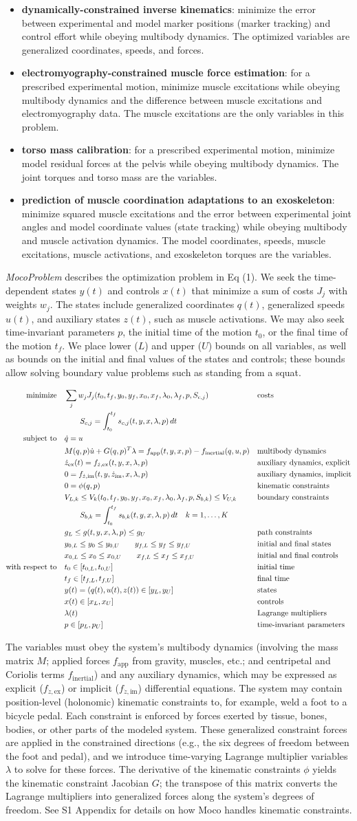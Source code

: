 \documentclass[10pt,letterpaper]{article}
\newcommand{\ocp}{
\begin{adjustwidth}{-1.125in}{-1.125in} %
\begin{align}
    \begin{aligned}
        \mbox{minimize}
         \quad & \sum_j w_{j} J_{j}(t_0, t_f, y_0, y_f, x_{0}, \mathrlap{x_{f}, \lambda_0, \lambda_f, p, S_{c,j})} && \textrm{costs} \\
        & \quad\quad S_{c,j} = \int_{t_0}^{t_f} s_{c,j}(t, y, x, \lambda, p)\,dt  \\
        \mbox{subject to}
         \quad & \dot{q} = u \\
         & M(q, p)\dot{u} + G(q, p)^T \lambda = f_{\mathrm{app}}(t, y, x, p) - f_{\mathrm{inertial}}(q, u, p)  && \textrm{multibody dynamics} \\
         & \dot{z}_\textrm{ex}(t) = f_{\dot{z},\textrm{ex}}(t, y, x, \lambda, p) && \textrm{auxiliary dynamics, explicit} \\
         & 0 = f_{\dot{z},\textrm{im}}(t, y, \dot{z}_{\textrm{im}}, x, \lambda, p) &&  \textrm{auxiliary dynamics, implicit}\\
         & 0 = \phi(q, p) && \textrm{kinematic constraints} \\
         & V_{L,k} \leq V_k(t_0, t_f, y_0, y_f, x_{0}, x_{f}, \lambda_0, \lambda_f, p, S_{b,k}) \leq V_{U,k} && \textrm{boundary constraints} \\
         & \quad\quad S_{b,k} = \int_{t_0}^{t_f} s_{b,k}(t, y, x, \lambda, p)\,dt \quad k = 1, \ldots, K\\
         & g_{L} \leq g(t, y, x, \lambda, p) \leq g_{U} && \textrm{path constraints} \\
         & y_{0,L} \leq y_0 \leq y_{0,U} \quad\quad y_{f,L} \leq y_f \leq y_{f,U} && \textrm{initial and final states} \\
         & x_{0,L} \leq x_0 \leq x_{0,U} \quad\quad x_{f,L} \leq x_f \leq x_{f,U} && \textrm{initial and final controls} \\
         \mbox{with respect to} \quad
         & t_0 \in [t_{0,L}, t_{0,U}] && \textrm{initial time} \\
         & t_f \in [t_{f,L}, t_{f,U}] && \textrm{final time} \\
         & y(t) = (q(t), u(t), z(t)) \in [y_{L}, y_{U}] && \textrm{states} \\
         & x(t) \in [x_{L}, x_{U}] && \textrm{controls} \\
         & \lambda(t) && \textrm{Lagrange multipliers} \\
         & p \in [p_{L}, p_{U}] && \textrm{time-invariant parameters}
    \end{aligned}
\end{align}
\end{adjustwidth}
}
\begin{document}
\begin{itemize}
\item \textbf{dynamically-constrained inverse kinematics}: minimize the error between experimental and model marker positions (marker tracking) and control effort while obeying multibody dynamics. The optimized variables are generalized coordinates, speeds, and forces.
\item \textbf{electromyography-constrained muscle force estimation}: for a prescribed experimental motion, minimize muscle excitations while obeying multibody dynamics and the difference between muscle excitations and electromyography data. The muscle excitations are the only variables in this problem.
\item \textbf{torso mass calibration}: for a prescribed experimental motion, minimize model residual forces at the pelvis while obeying multibody dynamics. The joint torques and torso mass are the variables.
\item \textbf{prediction of muscle coordination adaptations to an exoskeleton}: minimize squared muscle excitations and the error between experimental joint angles and model coordinate values (state tracking) while obeying multibody and muscle activation dynamics. The model coordinates, speeds, muscle excitations, muscle activations, and exoskeleton torques are the variables.
\end{itemize}
\textit{MocoProblem} describes the optimization problem in Eq (1). We seek the time-dependent states $y(t)$ and controls $x(t)$ that minimize a sum of costs $J_j$ with weights $w_j$. The states include generalized coordinates $q(t)$, generalized speeds $u(t)$, and auxiliary states $z(t)$, such as muscle activations. We may also seek time-invariant parameters $p$, the initial time of the motion $t_0$, or the final time of the motion $t_f$. We place lower ($L$) and upper ($U$) bounds on all variables, as well as bounds on the initial and final values of the states and controls; these bounds allow solving boundary value problems such as standing from a squat.

\ocp

The variables must obey the system's multibody dynamics (involving the mass matrix $M$; applied forces $f_\mathrm{app}$ from gravity, muscles, etc.; and centripetal and Coriolis terms $f_\mathrm{inertial}$) and any auxiliary dynamics, which may be expressed as explicit ($f_{\dot{z},\mathrm{ex}}$) or implicit ($f_{\dot{z},\mathrm{im}}$) differential equations. The system may contain position-level (holonomic) kinematic constraints to, for example, weld a foot to a bicycle pedal. Each constraint is enforced by forces exerted by tissue, bones, bodies, or other parts of the modeled system. These generalized constraint forces are applied in the constrained directions (e.g., the six degrees of freedom between the foot and pedal), and we introduce time-varying Lagrange multiplier variables $\lambda$ to solve for these forces. The derivative of the kinematic constraints $\phi$ yields the kinematic constraint Jacobian $G$; the transpose of this matrix converts the Lagrange multipliers into generalized forces along the system's degrees of freedom. See S1 Appendix for details on how Moco handles kinematic constraints.
\end{document}
